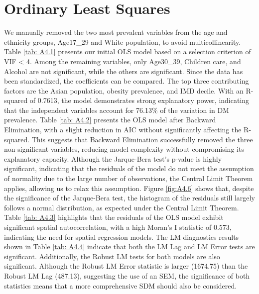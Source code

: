 \section{Ordinary Least Squares}
\label{chap:4.3}
We manually removed the two most prevalent variables from the age and ethnicity groups, Age17\_29 and White population, to avoid multicollinearity.
Table \ref{tab: A4.1} presents our initial OLS model based on a selection criterion of VIF < 4. Among the remaining variables, only Age30\_39, Children care, and Alcohol are not significant, while the others are significant. Since the data has been standardized, the coefficients can be compared. The top three contributing factors are the Asian population, obesity prevalence, and IMD decile. With an R-squared of 0.7613, the model demonstrates strong explanatory power, indicating that the independent variables account for 76.13\% of the variation in DM prevalence.
Table \ref{tab: A4.2} presents the OLS model after Backward Elimination, with a slight reduction in AIC without significantly affecting the R-squared. This suggests that Backward Elimination successfully removed the three non-significant variables, reducing model complexity without compromising its explanatory capacity.
Although the Jarque-Bera test's p-value is highly significant, indicating that the residuals of the model do not meet the assumption of normality due to the large number of observations, the Central Limit Theorem applies, allowing us to relax this assumption. Figure \ref{fig:A4.6} shows that, despite the significance of the Jarque-Bera test, the histogram of the residuals still largely follows a normal distribution, as expected under the Central Limit Theorem.
Table \ref{tab: A4.3} highlights that the residuals of the OLS model exhibit significant spatial autocorrelation, with a high Moran's I statistic of 0.573, indicating the need for spatial regression models. The LM diagnostics results shown in Table \ref{tab: A4.4} indicate that both the LM Lag and LM Error tests are significant. Additionally, the Robust LM tests for both models are also significant. Although the Robust LM Error statistic is larger (1674.75) than the Robust LM Lag (487.13), suggesting the use of an SEM, the significance of both statistics means that a more comprehensive SDM should also be considered.

